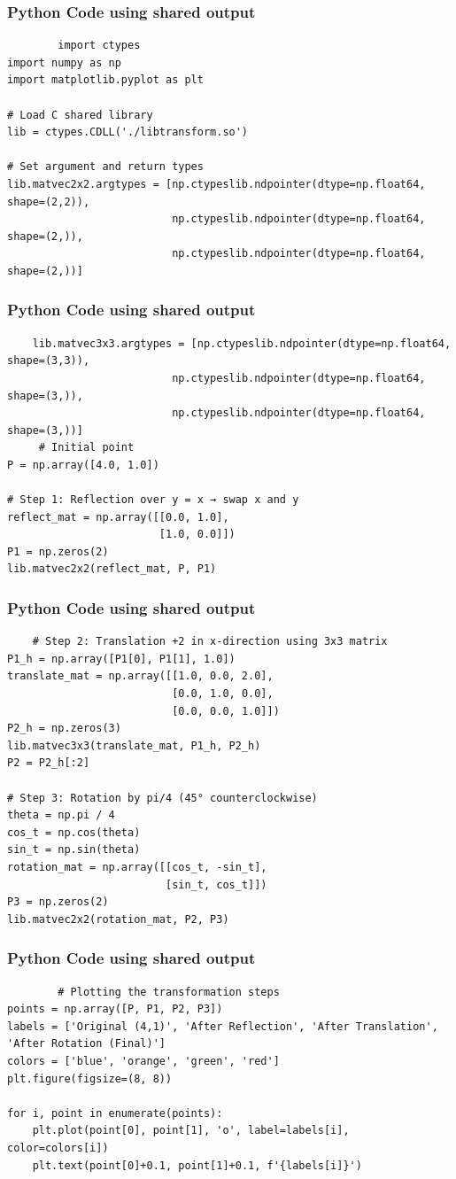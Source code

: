 \documentclass{beamer}
\begin{document}
\begin{frame}[fragile]
	\frametitle{Python Code using shared output}
    \scriptsize
	\begin{lstlisting}
		import ctypes
import numpy as np
import matplotlib.pyplot as plt

# Load C shared library
lib = ctypes.CDLL('./libtransform.so')

# Set argument and return types
lib.matvec2x2.argtypes = [np.ctypeslib.ndpointer(dtype=np.float64, shape=(2,2)),
                          np.ctypeslib.ndpointer(dtype=np.float64, shape=(2,)),
                          np.ctypeslib.ndpointer(dtype=np.float64, shape=(2,))]
	\end{lstlisting}
\end{frame}
\begin{frame}[fragile]
	\frametitle{Python Code using shared output}
	\begin{lstlisting}	
    lib.matvec3x3.argtypes = [np.ctypeslib.ndpointer(dtype=np.float64, shape=(3,3)),
                          np.ctypeslib.ndpointer(dtype=np.float64, shape=(3,)),
                          np.ctypeslib.ndpointer(dtype=np.float64, shape=(3,))]
     # Initial point
P = np.array([4.0, 1.0])

# Step 1: Reflection over y = x → swap x and y
reflect_mat = np.array([[0.0, 1.0],
                        [1.0, 0.0]])
P1 = np.zeros(2)
lib.matvec2x2(reflect_mat, P, P1)
	\end{lstlisting}
\end{frame}
\begin{frame}[fragile]
	\frametitle{Python Code using shared output}
	\begin{lstlisting}
    # Step 2: Translation +2 in x-direction using 3x3 matrix
P1_h = np.array([P1[0], P1[1], 1.0])
translate_mat = np.array([[1.0, 0.0, 2.0],
                          [0.0, 1.0, 0.0],
                          [0.0, 0.0, 1.0]])
P2_h = np.zeros(3)
lib.matvec3x3(translate_mat, P1_h, P2_h)
P2 = P2_h[:2]

# Step 3: Rotation by pi/4 (45° counterclockwise)
theta = np.pi / 4
cos_t = np.cos(theta)
sin_t = np.sin(theta)
rotation_mat = np.array([[cos_t, -sin_t],
                         [sin_t, cos_t]])
P3 = np.zeros(2)
lib.matvec2x2(rotation_mat, P2, P3)
	\end{lstlisting}
\end{frame}
\begin{frame}[fragile]
        \frametitle{Python Code using shared output}
        \begin{lstlisting}
        # Plotting the transformation steps
points = np.array([P, P1, P2, P3])
labels = ['Original (4,1)', 'After Reflection', 'After Translation', 'After Rotation (Final)']
colors = ['blue', 'orange', 'green', 'red']
plt.figure(figsize=(8, 8))
            
for i, point in enumerate(points):
    plt.plot(point[0], point[1], 'o', label=labels[i], color=colors[i])
    plt.text(point[0]+0.1, point[1]+0.1, f'{labels[i]}')
        \end{lstlisting}
\end{frame}
\end{document}
